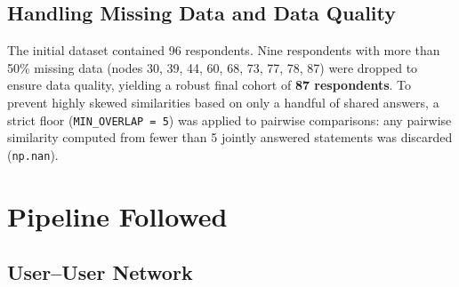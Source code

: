 \documentclass[11pt]{article}
\begin{document}
\subsection{Handling Missing Data and Data Quality}
The initial dataset contained 96 respondents. Nine respondents with more than 50\%
missing data (nodes 30, 39, 44, 60, 68, 73, 77, 78, 87) were dropped to ensure data
quality, yielding a robust final cohort of \textbf{87 respondents}. To prevent highly
skewed similarities based on only a handful of shared answers, a strict floor
(\texttt{MIN\_OVERLAP = 5}) was applied to pairwise comparisons: any pairwise similarity
computed from fewer than 5 jointly answered statements was discarded (\texttt{np.nan}).

\section{Pipeline Followed}

\subsection{User--User Network}
\end{document}
